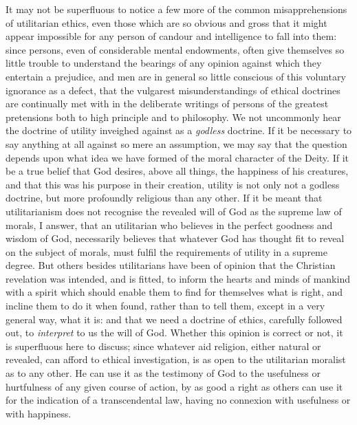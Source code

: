 It may not be superfluous to notice a few more of the common
misapprehensions of utilitarian ethics, even those which are so
obvious and gross that it might appear impossible for any person of
candour and intelligence to fall into them: since persons, even of
considerable mental endowments, often give themselves so little
trouble to understand the bearings of any opinion against which they
entertain a prejudice, and men are in general so little conscious of
this voluntary ignorance as a defect, that the vulgarest
misunderstandings of ethical doctrines are continually met with in the
deliberate writings of persons of the greatest pretensions both to
high principle and to philosophy. We not uncommonly hear the doctrine
of utility inveighed against as a \textit{godless} doctrine. If it be
necessary to say anything at all against so mere an assumption, we may
say that the question depends upon what idea we have formed of the
moral character of the Deity. If it be a true belief that God
desires, above all things, the happiness of his creatures, and that
this was his purpose in their creation, utility is  not only
not a godless doctrine, but more profoundly religious than any other.
If it be meant that utilitarianism does not recognise the revealed
will of God as the supreme law of morals, I answer, that an
utilitarian who believes in the perfect goodness and wisdom of God,
necessarily believes that whatever God has thought fit to reveal on
the subject of morals, must fulfil the requirements of utility in a
supreme degree. But others besides utilitarians have been of opinion
that the Christian revelation was intended, and is fitted, to inform
the hearts and minds of mankind with a spirit which should enable
them to find for themselves what is right, and incline them to do it
when found, rather than to tell them, except in a very general way,
what it is: and that we need a doctrine of ethics, carefully followed
out, to \textit{interpret} to us the will of God. Whether this opinion
is correct or not, it is superfluous here to discuss; since whatever
aid religion, either natural or revealed, can afford to ethical
investigation, is as open to the utilitarian moralist as to any
other. He can use it as the testimony of God to the usefulness or
hurtfulness of any given course of action, by as good a right as
others can use it for the indication of a transcendental law, having
no connexion with usefulness or with happiness.

